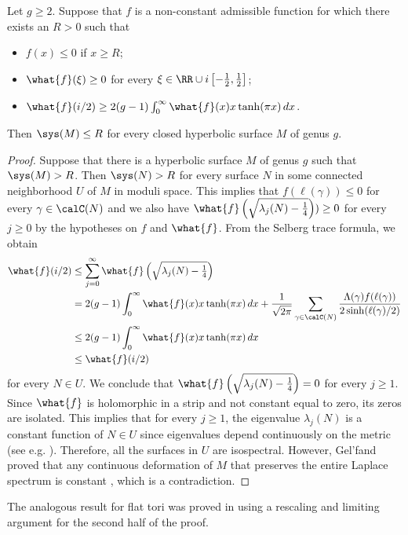 \documentclass[12pt]{amsart}
\numberwithin{equation}{section}
\begin{document}
\begin{thm} \label{thm:systole}
Let $g \geq 2$. Suppose that $f$ is a non-constant admissible function for which there exists an $R>0$ such that
\begin{itemize}
\item $f(x)\leq 0$ if $x \geq R$;
\item $\what{f}(\xi) \geq 0$ for every $\xi \in \RR \cup i\left[-\frac12,\frac12\right]$;
\item $\what{f}(i/2) \geq 2(g-1)\int_0^\infty \what{f}(x) x \tanh(\pi x) \,dx$.
\end{itemize}
Then $\sys(M) \leq R$ for every closed hyperbolic surface $M$ of genus $g$. 
\end{thm}
\begin{proof}
Suppose that there is a hyperbolic surface $M$ of genus $g$ such that $\sys(M)> R$. Then $\sys(N)>R$ for every surface $N$ in some connected neighborhood $U$ of $M$ in moduli space. This implies that  $f(\ell(\gamma)) \leq 0$ for every $\gamma \in \calC(N)$ and we also have $\what{f}\left(\textstyle\sqrt{\lambda_j(N)-\frac14}\right)) \geq 0$ for every $j\geq 0$ by the hypotheses on $f$ and $\what{f}$. From the Selberg trace formula, we obtain
\begin{align*}
\what{f}(i/2) &\leq \sum_{j=0}^\infty \what{f}\left(\textstyle\sqrt{\lambda_j(N)-\frac14}\right)\\
 & = 2(g-1)\int_0^\infty \what{f}(x) x \tanh(\pi x) \,dx + \frac{1}{\sqrt{2\pi}}\sum_{\gamma \in \calC(N)} \frac{\Lambda(\gamma) f(\ell(\gamma))}{2 \sinh(\ell(\gamma)/2)} \\
&\leq 2(g-1)\int_0^\infty \what{f}(x) x \tanh(\pi x) \,dx \\
&\leq \what{f}(i/2)
\end{align*}
for every $N \in U$. We conclude that $\what{f}\left(\textstyle\sqrt{\lambda_j(N)-\frac14}\right)=0$ for every $j\geq 1$. Since $\what{f}$ is holomorphic in a strip and not constant equal to zero, its zeros are isolated. This implies that for every $j\geq 1$, the eigenvalue $\lambda_j(N)$ is a constant function of $N \in U$ since eigenvalues depend continuously on the metric (see e.g. \cite{Bando}). Therefore, all the surfaces in $U$ are isospectral. However, Gel'fand proved that any continuous deformation of $M$ that preserves the entire Laplace spectrum is constant \cite{Gelfand}, which is a contradiction.
\end{proof}

\begin{rem}
The analogous result for flat tori was proved in \cite[Theorem 3.2]{CohnElkies} using a rescaling and limiting argument for the second half of the proof. 
\end{rem}
\end{document}
